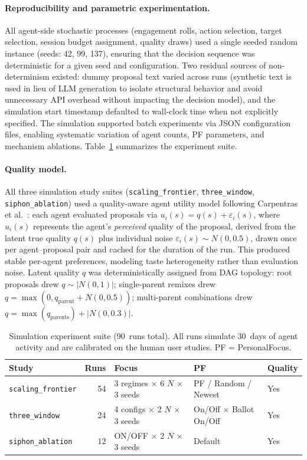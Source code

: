 \documentclass[a4paper, 12pt, twoside]{iviathesis}
\begin{document}
\paragraph{Reproducibility and parametric experimentation.}
All agent-side stochastic processes (engagement rolls, action selection, target selection, session budget assignment, quality draws) used a single seeded random instance (seeds: 42, 99, 137), ensuring that the decision sequence was deterministic for a given seed and configuration. Two residual sources of non-determinism existed: dummy proposal text varied across runs (synthetic text is used in lieu of LLM generation to isolate structural behavior and avoid unnecessary API overhead without impacting the decision model), and the simulation start timestamp defaulted to wall-clock time when not explicitly specified. The simulation supported batch experiments via JSON configuration files, enabling systematic variation of agent counts, PF parameters, and mechanism ablations. Table~\ref{tab:sim-suite} summarizes the experiment suite.


\paragraph{Quality model.}
All three simulation study suites (\texttt{scaling\_frontier}, \texttt{three\_window}, \texttt{siphon\_ablation}) used a quality-aware agent utility model following Carpentras et al.\ \cite{carpentras_wisdom_2025}: each agent evaluated proposals via $u_i(s) = q(s) + \varepsilon_i(s)$, where $u_i(s)$ represents the agent's \textit{perceived} quality of the proposal, derived from the latent true quality $q(s)$ plus individual noise $\varepsilon_i(s) \sim N(0, 0.5)$, drawn once per agent--proposal pair and cached for the duration of the run. This produced stable per-agent preferences, modeling taste heterogeneity rather than evaluation noise. Latent quality $q$ was deterministically assigned from DAG topology: root proposals drew $q \sim |N(0,1)|$; single-parent remixes drew $q = \max(0, q_{\text{parent}} + N(0, 0.5))$; multi-parent combinations drew $q = \max(q_{\text{parents}}) + |N(0, 0.3)|$.


\begin{table}[ht]
\centering
\caption{Simulation experiment suite (90~runs total). All runs simulate 30~days of agent activity and are calibrated on the human user studies. PF = PersonalFocus.}
\label{tab:sim-suite}
\small
\begin{tabular}{l r l l l}
\toprule
\textbf{Study} & \textbf{Runs} & \textbf{Focus} & \textbf{PF} & \textbf{Quality} \\
\midrule
\texttt{scaling\_frontier}    & 54 & 3 regimes $\times$ 6 $N$ $\times$ 3 seeds  & PF / Random / Newest & Yes \\
\texttt{three\_window}         & 24 & 4 configs $\times$ 2 $N$ $\times$ 3 seeds  & On/Off $\times$ Ballot On/Off & Yes \\
\texttt{siphon\_ablation}     & 12 & ON/OFF $\times$ 2 $N$ $\times$ 3 seeds     & Default & Yes \\
\bottomrule
\end{tabular}
\end{table}
\end{document}
